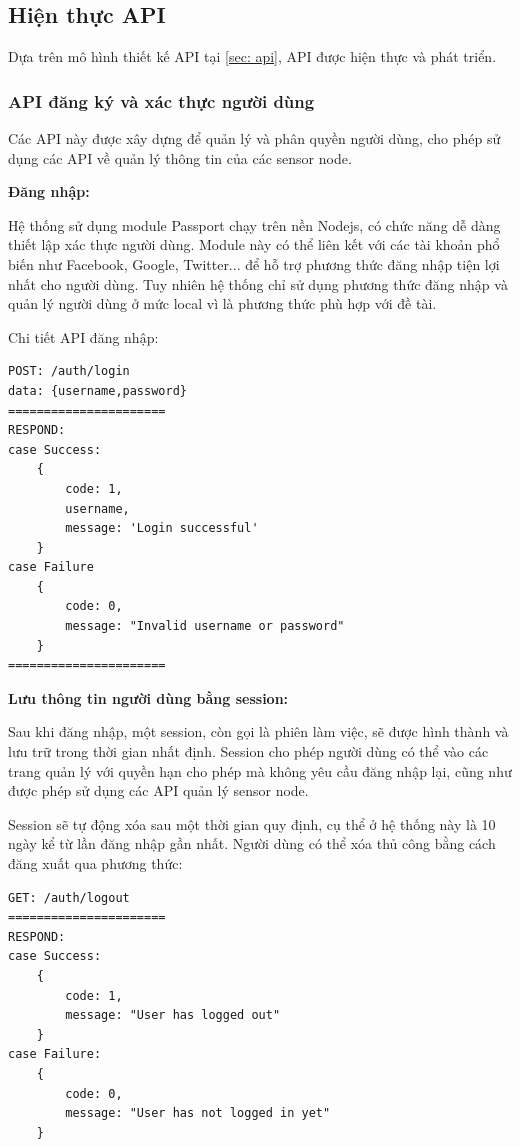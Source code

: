\subsection{Hiện thực API}
Dựa trên mô hình thiết kế API tại \ref{sec: api}, API được hiện thực và phát triển.


\subsubsection*{API đăng ký và xác thực người dùng}

Các API này được xây dựng để quản lý và phân quyền người dùng, cho phép sử dụng các API về quản lý thông tin của các sensor node.

\textbf{Đăng nhập:}

Hệ thống sử dụng module Passport chạy trên nền Nodejs, có chức năng dễ dàng thiết lập xác thực người dùng. Module này có thể liên kết với các tài khoản phổ biến như Facebook, Google, Twitter... để hỗ trợ phương thức đăng nhập tiện lợi nhất cho người dùng. Tuy nhiên hệ thống chỉ sử dụng phương thức đăng nhập và quản lý người dùng ở mức local vì là phương thức phù hợp với đề tài.

Chi tiết API đăng nhập:
\begin{Verbatim}[xleftmargin=2em]
POST: /auth/login
data: {username,password}
======================
RESPOND:
case Success:
	{
		code: 1,
		username,
		message: 'Login successful'
	}
case Failure	
	{
		code: 0,
		message: "Invalid username or password"
	}
======================
\end{Verbatim}

\textbf{Lưu thông tin người dùng bằng session:}

Sau khi đăng nhập, một session, còn gọi là phiên làm việc, sẽ được hình thành và lưu trữ trong thời gian nhất định. Session cho phép người dùng có thể vào các trang quản lý với quyền hạn cho phép mà không yêu cầu đăng nhập lại, cũng như được phép sử dụng các API quản lý sensor node.

Session sẽ tự động xóa sau một thời gian quy định, cụ thể ở hệ thống này là 10 ngày kể từ lần đăng nhập gần nhất. Người dùng có thể xóa thủ công bằng cách đăng xuất qua phương thức:
\begin{Verbatim}[xleftmargin=2em]
GET: /auth/logout
======================
RESPOND:
case Success:
	{
		code: 1,
		message: "User has logged out"
	}
case Failure:	
	{
		code: 0,
		message: "User has not logged in yet"
	}	
\end{Verbatim}

